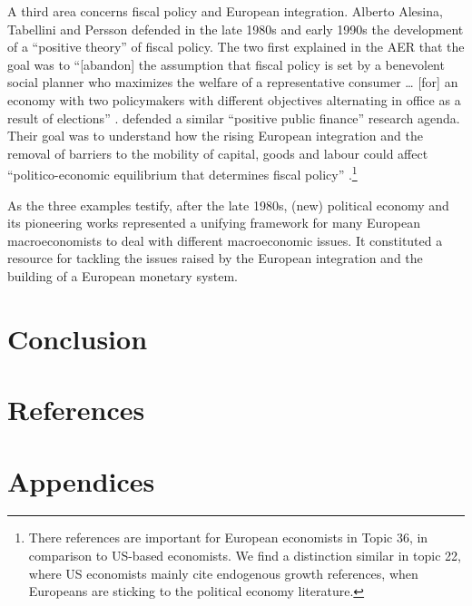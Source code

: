 \documentclass[]{elsarticle} %
\newlength{\cslhangindent}
\newlength{\cslentryspacingunit} %
\newenvironment{CSLReferences}[2] %
 {%
  \setlength{\parindent}{0pt}
  \ifodd #1
  \let\oldpar\par
  \def\par{\hangindent=\cslhangindent\oldpar}
  \fi
  \setlength{\parskip}{#2\cslentryspacingunit}
 }%
 {}
\begin{document}
A third area concerns fiscal policy and European integration. Alberto
Alesina, Tabellini and Persson defended in the late 1980s and early
1990s the development of a ``positive theory'' of fiscal policy. The two
first explained in the AER that the goal was to ``{[}abandon{]} the
assumption that fiscal policy is set by a benevolent social planner who
maximizes the welfare of a representative consumer \ldots{} {[}for{]} an
economy with two policymakers with different objectives alternating in
office as a result of elections'' \citep{alesina1990}.
\citet{persson1992} defended a similar ``positive public finance''
research agenda. Their goal was to understand how the rising European
integration and the removal of barriers to the mobility of capital,
goods and labour could affect ``politico-economic equilibrium that
determines fiscal policy'' \citep[689]{persson1992}.\footnote{There
  references are important for European economists in Topic 36, in
  comparison to US-based economists. We find a distinction similar in
  topic 22, where US economists mainly cite endogenous growth
  references, when Europeans are sticking to the political economy
  literature.}

As the three examples testify, after the late 1980s, (new) political
economy and its pioneering works
\citep{kydland1977, barro1983, barro1983c, rogoff1985b} represented a
unifying framework for many European macroeconomists to deal with
different macroeconomic issues. It constituted a resource for tackling
the issues raised by the European integration and the building of a
European monetary system.

\hypertarget{conclusion}{%
\section*{Conclusion}\label{conclusion}}

\newpage

\hypertarget{references}{%
\section*{References}\label{references}}

\hypertarget{refs}{}
\begin{CSLReferences}{0}{0}
\end{CSLReferences}

\newpage

\hypertarget{appendices}{%
\section*{Appendices}\label{appendices}}
\end{document}
